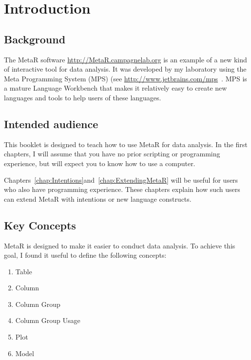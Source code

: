 


\chapter{Introduction}\label{chap:Introduction}
\section{Background}
The MetaR software \url{http://MetaR.campagnelab.org} is an example of a new kind of interactive tool for data analysis. It was developed by my laboratory using the Meta Programming System (MPS) (see \url{http://www.jetbrains.com/mps}~\cite{Dmitriev:2004,campagne2014mps}. MPS is a mature Language Workbench that makes it relatively easy to create new languages and tools to help users of these languages. 

\section{Intended audience}
This booklet is designed to teach how to use MetaR for data analysis. In the first chapters, I will assume that you have no prior scripting or programming experience, but will expect you to know how to use a computer.

Chapters~\ref{chap:Intentions}and~\ref{chap:ExtendingMetaR} will be useful for users who also have programming experience. These chapters explain how such users can extend MetaR with intentions or new language constructs.

\section{Key Concepts}
MetaR is designed to make it easier to conduct data analysis. To achieve this goal, I found it useful to define the following concepts:

\begin{enumerate}
	\item Table
	\item Column
	\item Column Group
	\item Column Group Usage
	\item Plot
	\item Model
\end{enumerate}
